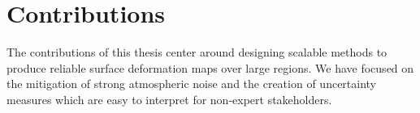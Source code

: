 





\section{Contributions}
\label{sec:chap1-contributions}


The contributions of this thesis center around designing scalable methods to produce reliable surface deformation maps over large regions. We have focused on the mitigation of strong atmospheric noise and the creation of uncertainty measures which are easy to interpret for non-expert stakeholders.


